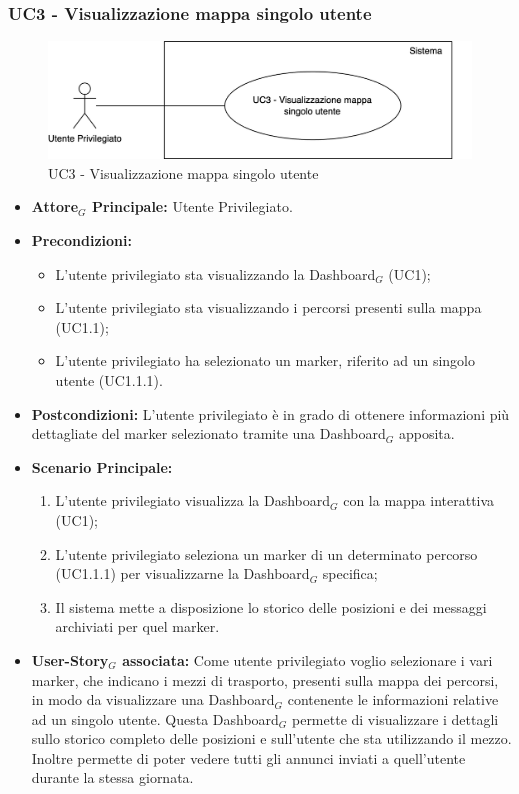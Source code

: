\documentclass[11pt]{article}
\begin{document}
\begin{justify}
\subsubsection{\textbf{UC3 - Visualizzazione mappa singolo utente}}
\begin{figure}[H]
    \centering
    \includegraphics[width=0.7\linewidth]{UC3image.png}
    \caption{UC3 - Visualizzazione mappa singolo utente}
    \label{fig:UC3}
\end{figure}
    \label{UC3}
\begin{itemize}
     \item \textbf{Attore$_G$ Principale:} Utente Privilegiato.
     \item \textbf{Precondizioni:}
        \begin{itemize}
    		\item L'utente privilegiato sta visualizzando la Dashboard$_G$ (UC1);
    	        \item L'utente privilegiato sta visualizzando i percorsi presenti sulla mappa (UC1.1);
    	        \item L'utente privilegiato ha selezionato un marker, riferito ad un singolo utente (UC1.1.1).
        \end{itemize}
     \item \textbf{Postcondizioni:} L'utente privilegiato è in grado di ottenere informazioni più dettagliate del marker selezionato tramite una Dashboard$_G$ apposita.
     \item \textbf{Scenario Principale:}
        \begin{enumerate}
            \item L'utente privilegiato visualizza la Dashboard$_G$ con la mappa interattiva (UC1);
            \item L'utente privilegiato seleziona un marker di un determinato percorso (UC1.1.1) per visualizzarne la Dashboard$_G$ specifica;
            \item Il sistema mette a disposizione lo storico delle posizioni e dei messaggi archiviati per quel marker.
        \end{enumerate}
     \item \textbf{User-Story$_G$ associata:}
     Come utente privilegiato voglio selezionare i vari marker, che indicano i mezzi di trasporto, presenti sulla mappa dei percorsi, in modo da visualizzare una Dashboard$_G$ contenente le informazioni relative ad un singolo utente. Questa Dashboard$_G$ permette di visualizzare i dettagli sullo storico completo delle posizioni e sull'utente che sta utilizzando il mezzo. Inoltre permette di poter vedere tutti gli annunci inviati a quell'utente durante la stessa giornata.
\end{itemize}


\end{justify}
\end{document}
